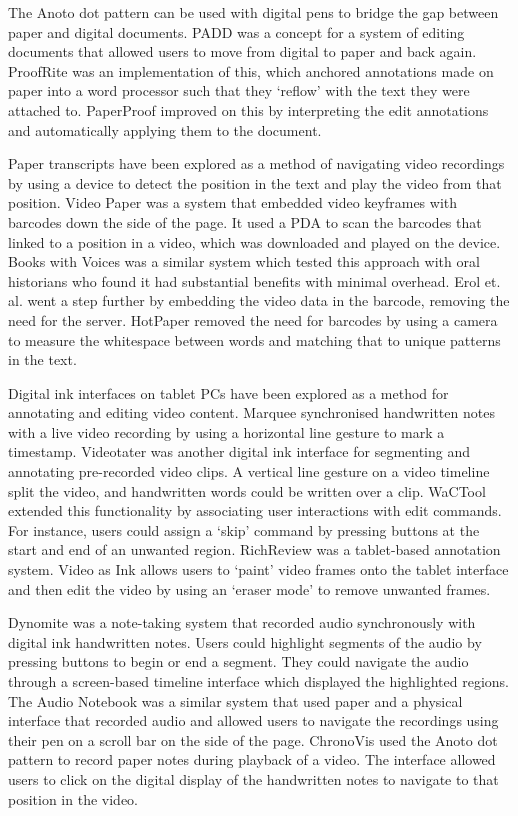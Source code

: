 The Anoto dot pattern can be used with digital pens to bridge the gap between paper and digital documents. PADD
\citep{Guimbretiere2003} was a concept for a system of editing documents that allowed users to move from digital to
paper and back again. ProofRite \citep{Conroy2004} was an implementation of this, which anchored annotations made on
paper into a word processor such that they `reflow' with the text they were attached to.  PaperProof \citep{Weibel2008}
improved on this by interpreting the edit annotations and automatically applying them to the document.

Paper transcripts have been explored as a method of navigating video recordings by using a device to detect the
position in the text and play the video from that position. Video Paper \citep{Hull2003} was a system that embedded
video keyframes with barcodes down the side of the page. It used a PDA to scan the barcodes that linked to a position
in a video, which was downloaded and played on the device. Books with Voices \citep{Klemmer2003} was a similar system
which tested this approach with oral historians who found it had substantial benefits with minimal overhead. Erol et.
al. \citep{Erol2007} went a step further by embedding the video data in the barcode, removing the need for the server.
HotPaper \citep{Erol2008} removed the need for barcodes by using a camera to measure the whitespace between words and
matching that to unique patterns in the text.

Digital ink interfaces on tablet PCs have been explored as a method for annotating and editing video content.  Marquee
\citep{Weher1994} synchronised handwritten notes with a live video recording by using a horizontal line gesture to mark
a timestamp.  Videotater \citep{Diakopoulos2006} was another digital ink interface for segmenting and annotating
pre-recorded video clips. A vertical line gesture on a video timeline split the video, and handwritten words could be
written over a clip. WaCTool \citep{Cattelan2008} extended this functionality by associating user interactions with
edit commands. For instance, users could assign a `skip' command by pressing buttons at the start and end of an
unwanted region.
RichReview \citep{Yoon2014} was a tablet-based annotation system.
Video as Ink \citep{Cabral2016} allows users to `paint' video frames onto the tablet interface and
then edit the video by using an `eraser mode' to remove unwanted frames.

Dynomite \citep{Wilcox1997} was a note-taking system that recorded audio synchronously with digital ink handwritten
notes.  Users could highlight segments of the audio by pressing buttons to begin or end a segment. They could navigate
the audio through a screen-based timeline interface which displayed the highlighted regions.  The Audio Notebook
\citep{Stifelman2001} was a similar system that used paper and a physical interface that recorded audio and allowed
users to navigate the recordings using their pen on a scroll bar on the side of the page.  ChronoVis \citep{Fouse2011}
used the Anoto dot pattern to record paper notes during playback of a video. The interface allowed users to click on
the digital display of the handwritten notes to navigate to that position in the video.

